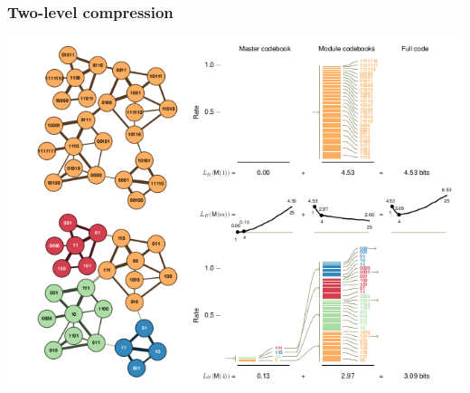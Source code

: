 \documentclass{beamer}
\begin{document}
\begin{frame}
  \frametitle{Two-level compression}
  \begin{center}
    \includegraphics[height = 0.8\textheight, width = \textwidth,  keepaspectratio = true]{figure/code_expand}

    \tiny{}
  \end{center}
\end{frame}
\end{document}
